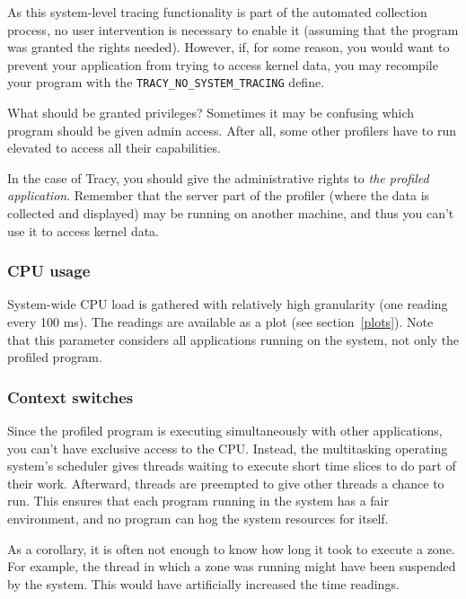 \documentclass[hidelinks,titlepage,a4paper]{article}
\begin{document}
As this system-level tracing functionality is part of the automated collection process, no user intervention is necessary to enable it (assuming that the program was granted the rights needed). However, if, for some reason, you would want to prevent your application from trying to access kernel data, you may recompile your program with the \texttt{TRACY\_NO\_SYSTEM\_TRACING} define.

\begin{bclogo}[
noborder=true,
couleur=black!5,
logo=\bclampe
]{What should be granted privileges?}
Sometimes it may be confusing which program should be given admin access. After all, some other profilers have to run elevated to access all their capabilities.

In the case of Tracy, you should give the administrative rights to \emph{the profiled application}. Remember that the server part of the profiler (where the data is collected and displayed) may be running on another machine, and thus you can't use it to access kernel data.
\end{bclogo}

\subsubsection{CPU usage}

System-wide CPU load is gathered with relatively high granularity (one reading every 100 \si{\milli\second}). The readings are available as a plot (see section~\ref{plots}). Note that this parameter considers all applications running on the system, not only the profiled program.

\subsubsection{Context switches}
\label{contextswitches}

Since the profiled program is executing simultaneously with other applications, you can't have exclusive access to the CPU. Instead, the multitasking operating system's scheduler gives threads waiting to execute short time slices to do part of their work. Afterward, threads are preempted to give other threads a chance to run. This ensures that each program running in the system has a fair environment, and no program can hog the system resources for itself.

As a corollary, it is often not enough to know how long it took to execute a zone. For example, the thread in which a zone was running might have been suspended by the system. This would have artificially increased the time readings.
\end{document}

